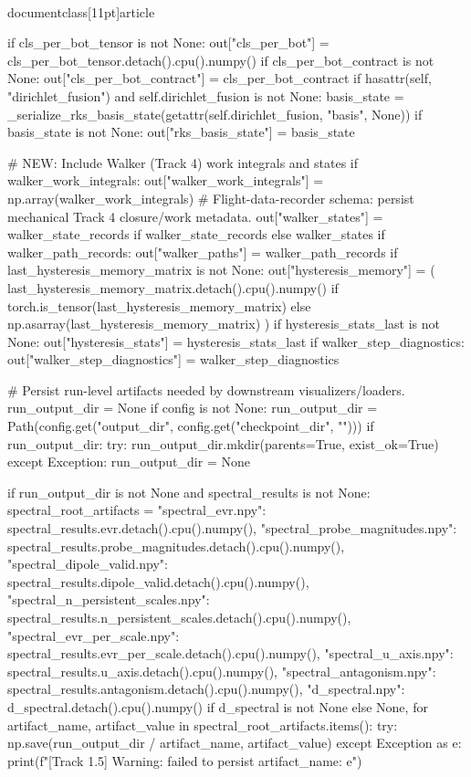 \\documentclass[11pt]{article}
\begin{document}
\begin{CodeBlock}
        if cls_per_bot_tensor is not None:
            out["cls_per_bot"] = cls_per_bot_tensor.detach().cpu().numpy()
        if cls_per_bot_contract is not None:
            out["cls_per_bot_contract"] = cls_per_bot_contract
        if hasattr(self, "dirichlet_fusion") and self.dirichlet_fusion is not None:
            basis_state = _serialize_rks_basis_state(getattr(self.dirichlet_fusion, "basis", None))
            if basis_state is not None:
                out["rks_basis_state"] = basis_state

        # NEW: Include Walker (Track 4) work integrals and states
        if walker_work_integrals:
            out["walker_work_integrals"] = np.array(walker_work_integrals)
            # Flight-data-recorder schema: persist mechanical Track 4 closure/work metadata.
            out["walker_states"] = walker_state_records if walker_state_records else walker_states
        if walker_path_records:
            out["walker_paths"] = walker_path_records
        if last_hysteresis_memory_matrix is not None:
            out["hysteresis_memory"] = (
                last_hysteresis_memory_matrix.detach().cpu().numpy()
                if torch.is_tensor(last_hysteresis_memory_matrix)
                else np.asarray(last_hysteresis_memory_matrix)
            )
        if hysteresis_stats_last is not None:
            out["hysteresis_stats"] = hysteresis_stats_last
        if walker_step_diagnostics:
            out["walker_step_diagnostics"] = walker_step_diagnostics

        # Persist run-level artifacts needed by downstream visualizers/loaders.
        run_output_dir = None
        if config is not None:
            run_output_dir = Path(config.get("output_dir", config.get("checkpoint_dir", "")))
        if run_output_dir:
            try:
                run_output_dir.mkdir(parents=True, exist_ok=True)
            except Exception:
                run_output_dir = None

        if run_output_dir is not None and spectral_results is not None:
            spectral_root_artifacts = {
                "spectral_evr.npy": spectral_results.evr.detach().cpu().numpy(),
                "spectral_probe_magnitudes.npy": spectral_results.probe_magnitudes.detach().cpu().numpy(),
                "spectral_dipole_valid.npy": spectral_results.dipole_valid.detach().cpu().numpy(),
                "spectral_n_persistent_scales.npy": spectral_results.n_persistent_scales.detach().cpu().numpy(),
                "spectral_evr_per_scale.npy": spectral_results.evr_per_scale.detach().cpu().numpy(),
                "spectral_u_axis.npy": spectral_results.u_axis.detach().cpu().numpy(),
                "spectral_antagonism.npy": spectral_results.antagonism.detach().cpu().numpy(),
                "d_spectral.npy": d_spectral.detach().cpu().numpy() if d_spectral is not None else None,
            }
            for artifact_name, artifact_value in spectral_root_artifacts.items():
                try:
                    np.save(run_output_dir / artifact_name, artifact_value)
                except Exception as e:
                    print(f"[Track 1.5] Warning: failed to persist {artifact_name}: {e}")


\end{CodeBlock}
\end{document}
